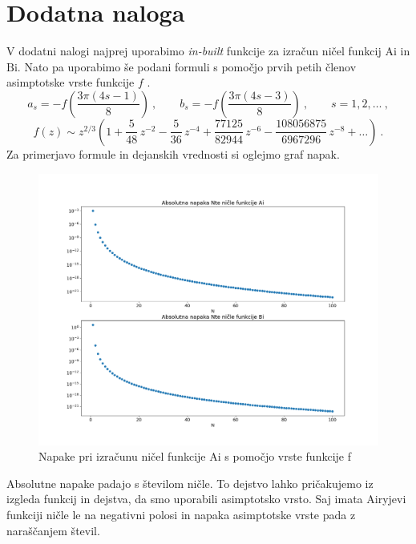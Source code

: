 \documentclass{article}
\newcommand{\Ai}{\mathrm{Ai}}
\newcommand{\Bi}{\mathrm{Bi}}
\begin{document}
\section{Dodatna naloga}
V dodatni nalogi najprej uporabimo \emph{in-built} funkcije za izračun ničel funkcij $\Ai$ in $\Bi$. Nato pa uporabimo še podani formuli s pomočjo prvih petih členov asimptotske vrste funkcije $f$ \cite{1_abram}. 
%
\begin{equation*}
    a_s = - f \left( \frac{3\pi(4s-1)}{8} \right) \>, \qquad
    b_s = - f \left( \frac{3\pi(4s-3)}{8} \right) \>, \qquad s = 1,2,\ldots \>,
\end{equation*}
%
\begin{equation*}
f(z) \sim z^{2/3} \left(
1 + \frac{5}{48} \, z^{-2}
-\frac{5}{36} \, z^{-4}
+\frac{77125}{82944} \, z^{-6}
-\frac{108056875}{6967296} \, z^{-8} + \ldots\right) \>.
\end{equation*}
Za primerjavo formule in dejanskih vrednosti si oglejmo graf napak. 
\begin{figure}[H]
    \centering
    \includegraphics[width=1.1\textwidth]{zeros.png}
    \caption{Napake pri izračunu ničel funkcije $\Ai$ s pomočjo vrste funkcije f}
\end{figure}
Absolutne napake padajo s številom ničle. To dejstvo lahko pričakujemo iz izgleda funkcij in dejstva, da smo uporabili asimptotsko vrsto. Saj imata Airyjevi funkciji ničle le na negativni polosi in napaka asimptotske vrste pada z naraščanjem števil.
\end{document}

